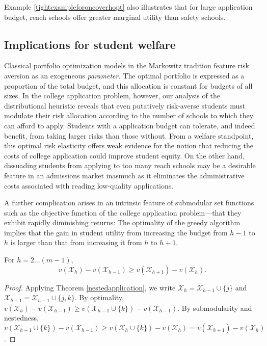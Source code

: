 Example \ref{tightexampleforoneoverhopt} also illustrates that for large application budget, reach schools offer greater marginal utility than safety schools.



\subsection{Implications for student welfare}


Classical portfolio optimization models in the Markowitz tradition feature risk aversion as an exogeneous \emph{parameter.} The optimal portfolio is expressed as a proportion of the total budget, and this allocation is constant for budgets of all sizes. In the college application problem, however, our analysis of the distributional heuristic reveals that even putatively risk-averse students must modulate their risk allocation according to the number of schools to which they can afford to apply. Students with a application budget can tolerate, and indeed benefit, from taking larger risks than those without. From a welfare standpoint, this optimal risk elasticity offers weak evidence for the notion that reducing the costs of college application could improve student equity. On the other hand, dissuading students from applying to too many reach schools may be a desirable feature in an admissions market inasmuch as it eliminates the administrative costs associated with reading low-quality applications. 

A further complication arises in an intrinsic feature of submodular set functions such as the objective function of the college application problem---that they exhibit rapidly diminishing returns: The optimality of the greedy algorithm implies that the gain in student utility from increasing the budget from $h-1$ to $h$ is larger than that from increasing it from $h$ to $h+1$.

\begin{theorem} \label{concavityinh}
For $h = 2 \dots (m-1)$,
\begin{equation}v(\mathcal{X}_h) - v(\mathcal{X}_{h-1}) \geq v(\mathcal{X}_{h+1}) - v(\mathcal{X}_{h}).\end{equation} 
\end{theorem}

\begin{proof}
Applying Theorem \ref{nestedapplication}, we write $\mathcal{X}_h = \mathcal{X}_{h-1} \cup\{j\}$ and $\mathcal{X}_{h+1} = \mathcal{X}_{h-1} \cup\{j, k\}$. By optimality, $v(\mathcal{X}_h) - v(\mathcal{X}_{h-1}) \geq v(\mathcal{X}_{h-1}\cup\{k\}) - v(\mathcal{X}_{h-1})$. By submodularity and nestedness, $v(\mathcal{X}_{h-1}\cup\{k\}) - v(\mathcal{X}_{h-1}) \geq  v(\mathcal{X}_{h}\cup\{k\}) - v(\mathcal{X}_{h}) = v(\mathcal{X}_{h+1}) - v(\mathcal{X}_{h})$.
\end{proof}

